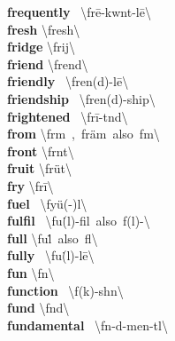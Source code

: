 \documentclass[10pt,a4paper]{article}
\begin{document}
\begin{multicols}{2}
\textbf{ frequently }\quad \ \textbackslash \textprimstress fr\={e}-kw\textschwa nt-l\={e}\textbackslash \\
\textbf{ fresh }\quad \textbackslash \textprimstress fresh\textbackslash \\
\textbf{ fridge }\quad \textbackslash \textprimstress frij\textbackslash \\
\textbf{ friend }\quad \textbackslash \textprimstress frend\textbackslash \\
\textbf{ friendly }\quad \ \textbackslash \textprimstress fren(d)-l\={e}\textbackslash \\
\textbf{ friendship }\quad \ \textbackslash \textprimstress fren(d)-\textsecstress ship\textbackslash \\
\textbf{ frightened }\quad \ \textbackslash \textprimstress fr\={i}-t\textsuperscript{\textreve}nd\textbackslash \\
\textbf{ from }\quad \textbackslash \textprimstress fr\textschwa m\ ,\ \textprimstress fr\"{a}m\ also\ f\textschwa m\textbackslash \\
\textbf{ front }\quad \textbackslash \textprimstress fr\textschwa nt\textbackslash \\
\textbf{ fruit }\quad \textbackslash \textprimstress fr\"{u}t\textbackslash \\
\textbf{ fry }\quad \textbackslash \textprimstress fr\={i}\textbackslash \\
\textbf{ fuel }\quad \ \textbackslash \textprimstress fy\"{u}(-\textschwa )l\textbackslash \\
\textbf{ fulfil }\quad \ \textbackslash fu\. (l)-\textprimstress fil\ also\ f\textschwa (l)-\textbackslash \\
\textbf{ full }\quad \textbackslash \textprimstress fu\. l\ also\ \textprimstress f\textschwa l\textbackslash \\
\textbf{ fully }\quad \ \textbackslash \textprimstress fu\. (l)-l\={e}\textbackslash \\
\textbf{ fun }\quad \textbackslash \textprimstress f\textschwa n\textbackslash \\
\textbf{ function }\quad \ \textbackslash \textprimstress f\textschwa \engma (k)-sh\textschwa n\textbackslash \\
\textbf{ fund }\quad \textbackslash \textprimstress f\textschwa nd\textbackslash \\
\textbf{ fundamental }\quad \ \textbackslash \textsecstress f\textschwa n-d\textschwa -\textprimstress men-t\textsuperscript{\textreve}l\textbackslash \\

\end{multicols}
\end{document}
